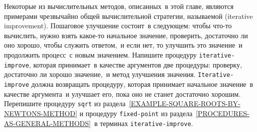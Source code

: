 \begin{exercise}{1.46}\label{EX1.46}%
Некоторые из вычислительных методов, описанных~в этой
главе, являются примерами чрезвычайно общей вычислительной стратегии,
называемой (iterative improvement).  Пошаговое улучшение состоит~в следующем: чтобы
что-то вычислить, нужно взять какое-то начальное значение,
проверить, достаточно ли оно хорошо, чтобы служить ответом,~и если
нет, то улучшить это значение~и продолжить процесс~с новым
значением.  Напишите процедуру {\tt iterative-improve}, которая 
принимает~в качестве аргументов две процедуры:  проверку, достаточно
ли хорошо значение,~и метод улучшения значения.
{\tt Iterative-improve} должна возвращать процедуру, которая
принимает начальное значение~в качестве аргумента~и улучшает его, пока 
оно не станет достаточно хорошим.  Перепишите процедуру
{\tt sqrt}
из раздела~\ref{EXAMPLE-SQUARE-ROOTS-BY-NEWTONS-METHOD}
и процедуру {\tt fixed-point} из
раздела~\ref{PROCEDURES-AS-GENERAL-METHODS}~в терминах
{\tt iterative-improve}. 
\end{exercise}
